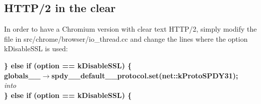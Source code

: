 \documentclass[12pt, notitlepage]{article}
\begin{document}
\subsection{HTTP/2 in the clear}
In order to have a Chromium version with clear text HTTP/2, simply
modify the file in src/chrome/browser/io\_thread.cc and change the lines where
the option kDisableSSL is used:

\textbf{\} else if (option == kDisableSSL) \{}\\
\hspace*{1cm}\textbf{globals\_\_$\rightarrow$spdy\_\_default\_\_protocol.set(net::kProtoSPDY31);}\\

\textit{into}\\

\textbf{\} else if (option == kDisableSSL) \{}\\
\end{document}
